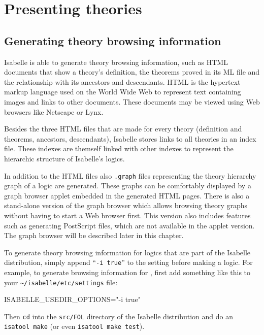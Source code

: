
\chapter{Presenting theories}

\section{Generating theory browsing information} \label{sec:info}

Isabelle is able to generate theory browsing information, such as HTML documents
that show a theory's definition, the theorems proved in its ML file and the relationship
with its ancestors and descendants. HTML is the hypertext markup
language used on the World Wide Web to represent text containing
images and links to other documents.  These documents may be viewed
using Web browsers like Netscape or Lynx.

Besides the three HTML files that are made for every theory
(definition and theorems, ancestors, descendants), Isabelle stores
links to all theories in an index file. These indexes are themself
linked with other indexes to represent the hierarchic structure of
Isabelle's logics.

In addition to the HTML files also {\tt *.graph} files representing the theory
hierarchy graph of a logic are generated. These graphs can be comfortably
displayed by a graph browser applet embedded in the generated HTML pages. There
is also a stand-alone version of the graph browser which allows browsing theory
graphs without having to start a Web browser first. This version also includes
features such as generating {\sc PostScript} files, which are not available in the
applet version. The graph browser will be described later in this chapter.

\medskip To generate theory browsing information for logics that are part of the Isabelle
distribution, simply append ``\texttt{-i true}'' to the
 setting before making a logic.  For
example, to generate browsing information for {\FOL}, first add something like
this to your \texttt{\~\relax/isabelle/etc/settings} file:
\begin{ttbox}
ISABELLE_USEDIR_OPTIONS="-i true"
\end{ttbox}
Then \texttt{cd} into the \texttt{src/FOL} directory of the Isabelle
distribution and do an \texttt{isatool make} (or even \texttt{isatool
  make test}).\\

